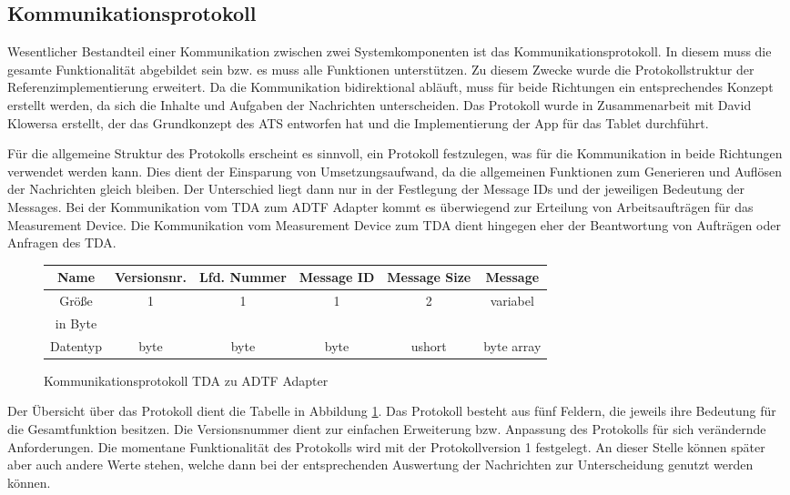 \documentclass[12pt,a4paper]{report}
\begin{document}
\subsection{Kommunikationsprotokoll}\label{subsec:Kommunikationsprotokoll}
Wesentlicher Bestandteil einer Kommunikation zwischen zwei Systemkomponenten ist das Kommunikationsprotokoll. In diesem muss die gesamte Funktionalität abgebildet sein bzw. es muss alle Funktionen unterstützen. Zu diesem Zwecke wurde die Protokollstruktur der Referenzimplementierung \cite{MasterEckerlebe} erweitert. Da die Kommunikation bidirektional abläuft, muss für beide Richtungen ein entsprechendes Konzept erstellt werden, da sich die Inhalte und Aufgaben der Nachrichten unterscheiden. Das Protokoll wurde in Zusammenarbeit mit David Klowersa erstellt, der das Grundkonzept des ATS entworfen hat und die Implementierung der App für das Tablet durchführt.

Für die allgemeine Struktur des Protokolls erscheint es sinnvoll, ein Protokoll festzulegen, was für die Kommunikation in beide Richtungen verwendet werden kann. Dies dient der Einsparung von Umsetzungsaufwand, da die allgemeinen Funktionen zum Generieren und Auflösen der Nachrichten gleich bleiben. Der Unterschied liegt dann nur in der Festlegung der Message IDs und der jeweiligen Bedeutung der Messages. Bei der Kommunikation vom TDA zum ADTF Adapter kommt es überwiegend zur Erteilung von Arbeitsaufträgen für das Measurement Device. Die Kommunikation vom Measurement Device zum TDA dient hingegen eher der Beantwortung von Aufträgen oder Anfragen des TDA.
\begin{figure}[H]
\begin{center}
\begin{tabular}{|c||*{5}{c|}}
\hline
Name & Versionsnr. & Lfd. Nummer & Message ID & Message Size & Message \\
\hline
Grö\ss e & 1 & 1 & 1 & 2 & variabel \\
in Byte & & & & & \\
\hline
Datentyp & byte & byte & byte & ushort & byte array \\
\hline
\end{tabular}
\caption{Kommunikationsprotokoll TDA zu ADTF Adapter}\label{tab:Kommunikationsprotokoll TDA zu ADTF Adapter}
\end{center}
\end{figure}
\noindent Der Übersicht über das Protokoll dient die Tabelle in Abbildung \ref{tab:Kommunikationsprotokoll TDA zu ADTF Adapter}. Das Protokoll besteht aus fünf Feldern, die jeweils ihre Bedeutung für die Gesamtfunktion besitzen. Die Versionsnummer dient zur einfachen Erweiterung bzw. Anpassung des Protokolls für sich verändernde Anforderungen. Die momentane Funktionalität des Protokolls wird mit der Protokollversion 1 festgelegt. An dieser Stelle können später aber auch andere Werte stehen, welche dann bei der entsprechenden Auswertung der Nachrichten zur Unterscheidung genutzt werden können.
\end{document}
